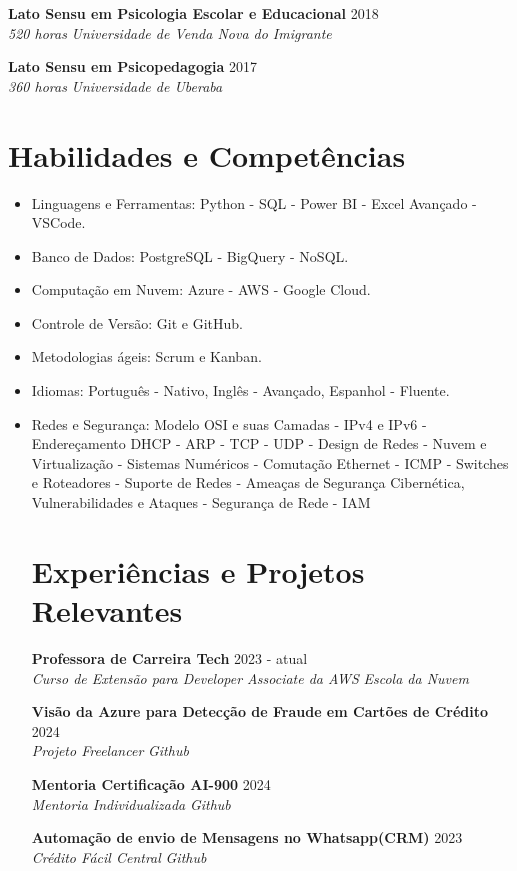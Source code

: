 \documentclass[a4paper,10pt]{article}
\newcommand{\entry}[4]{
  \noindent\textbf{#1} \hfill #2 \\
  \noindent\textit{#3} \hfill \textit{#4} \\
  \vspace{2pt}
}
\begin{document}
\entry{Lato Sensu em Psicologia Escolar e Educacional}{2018}{520 horas}{\faMapMarker \space Universidade de Venda Nova do Imigrante}

\entry{Lato Sensu em Psicopedagogia}{2017}{360 horas}{\faMapMarker \space Universidade de Uberaba}



\section*{Habilidades e Competências}
\vspace{0.6em}
\begin{itemize}
\setlength\itemsep{0em}
\item Linguagens e Ferramentas: Python - SQL - Power BI - Excel Avançado - VSCode.
\item Banco de Dados: PostgreSQL - BigQuery - NoSQL.
\item Computação em Nuvem: Azure - AWS - Google Cloud.
\item Controle de Versão: Git e GitHub.
\item Metodologias ágeis: Scrum e Kanban.
\item Idiomas: Português - Nativo, Inglês - Avançado, Espanhol - Fluente.
\item Redes e Segurança: Modelo OSI e suas Camadas - IPv4 e IPv6 - Endereçamento DHCP - ARP - TCP - UDP - Design de Redes - Nuvem e Virtualização - Sistemas Numéricos - Comutação Ethernet - ICMP - Switches e Roteadores - Suporte de Redes - Ameaças de Segurança Cibernética, Vulnerabilidades e Ataques - Segurança de Rede - IAM

\section*{Experiências e Projetos Relevantes}
\vspace{0.6em}

\entry{Professora de Carreira Tech }{2023 - atual}{Curso de Extensão para  Developer Associate da AWS}{\faMapMarker \space Escola da Nuvem}

\entry{Visão da Azure para Detecção de Fraude em Cartões de Crédito }{2024}{Projeto Freelancer}{\faMapMarker \space Github}

\entry{Mentoria Certificação AI-900}{2024}{Mentoria Individualizada}{\faMapMarker \space Github}

\entry{Automação de envio de Mensagens no Whatsapp(CRM)}{2023}{Crédito Fácil Central}{\faMapMarker \space Github}


\end{itemize}
\end{document}
